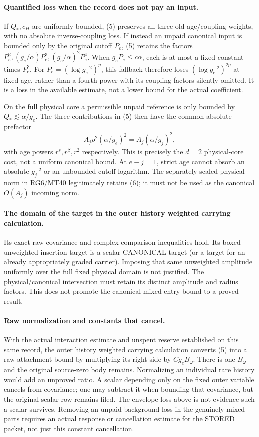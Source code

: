 \documentclass[11pt]{article}
\begin{document}
\paragraph{Quantified loss when the record does not pay an input.}
If $Q_*,c_H$ are uniformly bounded, (5) preserves all three old age/coupling
weights, with no absolute inverse-coupling loss. If instead an unpaid canonical
input is bounded only by the original cutoff $P_e$, (5) retains the factors
$P_e^2,(g_e/\alpha)P_e^3,(g_e/\alpha)^2P_e^4$.
When $g_eP_e\le c\alpha$, each is at most a fixed constant times $P_e^2$.
For $P_e=(\log g_e^{-2})^p$, this fallback therefore loses
$(\log g_e^{-2})^{2p}$ at fixed age, rather than a fourth power with its coupling
factors silently omitted. It is a loss in the available estimate, not a lower
bound for the actual coefficient.

On the full physical core a permissible unpaid reference is only bounded by
$Q_*\lesssim\alpha/g_e$. The three contributions in (5) then have the common
absolute prefactor
\[
 A_j\rho^2(\alpha/g_e)^2
       =A_j(\alpha/g_j)^2,                            \tag{6}
\]
with age powers $r^s,r^\beta,r^2$ respectively. This is precisely the $d=2$
physical-core cost, not a uniform canonical bound. At $e-j=1$, strict age cannot
absorb an absolute $g_j^{-2}$ or an unbounded cutoff logarithm. The separately
scaled physical norm in RG6/MT40 legitimately retains (6); it must not be used
as the canonical $O(A_j)$ incoming norm.

\paragraph{The domain of the target in the outer history weighted carrying calculation.}
Its exact raw covariance and complex comparison inequalities hold.
Its boxed unweighted insertion target is a scalar CANONICAL target (or a target
for an already appropriately graded carrier). Imposing that same unweighted
amplitude uniformly over the full fixed physical domain is not justified. The
physical/canonical intersection must retain its distinct amplitude and radius
factors. This does not promote the canonical mixed-entry bound to a
proved result.

\paragraph{Raw normalization and constants that cancel.}
With the actual interaction estimate and unspent reserve established on this same
record, the outer history weighted carrying calculation converts (5) into a raw attachment bound by multiplying its
right side by $C g_e B_\omega$. There is one $B_\omega$ and the original source-zero
body remains. Normalizing an individual rare history would add an unproved ratio.
A scalar depending only on the fixed outer variable cancels from covariance;
one may subtract it when bounding that covariance, but the original scalar row
remains filed. The envelope loss above is not evidence such a scalar survives.
Removing an unpaid-background loss in the genuinely mixed parts requires an
actual response or cancellation estimate for the STORED packet, not just this
constant cancellation.
\end{document}
